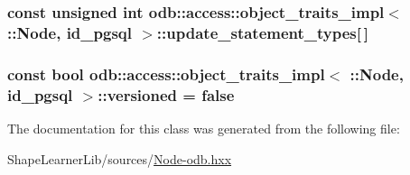 \subsubsection[{update\+\_\+statement\+\_\+types}]{\setlength{\rightskip}{0pt plus 5cm}const unsigned int odb\+::access\+::object\+\_\+traits\+\_\+impl$<$ \+::{\bf Node}, id\+\_\+pgsql $>$\+::update\+\_\+statement\+\_\+types\mbox{[}$\,$\mbox{]}\hspace{0.3cm}{\ttfamily [static]}}\label{classodb_1_1access_1_1object__traits__impl_3_01_1_1_node_00_01id__pgsql_01_4_a1a69f196cc6959424bf4a7c95c84df61}
\hypertarget{classodb_1_1access_1_1object__traits__impl_3_01_1_1_node_00_01id__pgsql_01_4_aaff6098d1d63663a5ff279cfcc746eec}{}
\subsubsection[{versioned}]{\setlength{\rightskip}{0pt plus 5cm}const {\bf bool} odb\+::access\+::object\+\_\+traits\+\_\+impl$<$ \+::{\bf Node}, id\+\_\+pgsql $>$\+::versioned = false\hspace{0.3cm}{\ttfamily [static]}}\label{classodb_1_1access_1_1object__traits__impl_3_01_1_1_node_00_01id__pgsql_01_4_aaff6098d1d63663a5ff279cfcc746eec}


The documentation for this class was generated from the following file\+:\begin{DoxyCompactItemize}
\item 
Shape\+Learner\+Lib/sources/\hyperlink{_node-odb_8hxx}{Node-\/odb.\+hxx}\end{DoxyCompactItemize}
